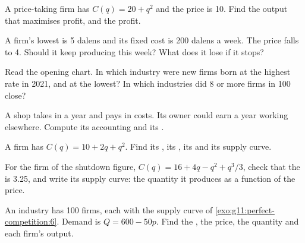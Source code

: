 \begin{exercise}[$\star$]\label{exo:g11:perfect-competition:2}
A price-taking firm has $C(q) = 20 + q^2$ and the price is 10. Find the output that maximises profit, and the profit.
\end{exercise}

\begin{exercise}[$\star$]\label{exo:g11:perfect-competition:3}
A firm's lowest  is 5 dalens and its fixed cost is 200 dalens a week. The price falls to 4. Should it keep producing this week? What does it
lose if it stops?
\end{exercise}

\begin{exercise}[$\star$]\label{exo:g11:perfect-competition:4}
Read the opening chart. In which industry were new firms born at the highest rate in 2021, and at the lowest? In which industries did 8 or more firms in 100
close?
\end{exercise}

\begin{exercise}[$\star$]\label{exo:g11:perfect-competition:5}
A shop takes in  a year and pays  in costs. Its owner could earn  a year working elsewhere. Compute its accounting and its .
\end{exercise}

\begin{exercise}[$\star\star$]\label{exo:g11:perfect-competition:6}
A firm has $C(q) = 10 + 2q + q^2$. Find its , its , its  and its supply curve.
\end{exercise}

\begin{exercise}[$\star\star$]\label{exo:g11:perfect-competition:7}
For the firm of the shutdown figure, $C(q) = 16 + 4q - q^2 + q^3/3$, check that the  is 3.25, and write its supply curve: the quantity it produces
as a function of the price.
\end{exercise}

\begin{exercise}[$\star\star$]\label{exo:g11:perfect-competition:8}
An industry has 100 firms, each with the supply curve of \cref{exo:g11:perfect-competition:6}. Demand is $Q = 600 - 50p$. Find the , the
price, the quantity and each firm's output.
\end{exercise}

